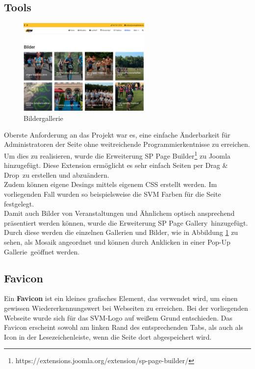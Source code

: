 \documentclass[12pt,a4paper]{article}
\begin{document}
\subsection{Tools}\label{subsec:Tools}
\begin{figure}
  \includegraphics[width=6.5cm]{Bildergallerie.png}
  \caption{Bildergallerie}
  \label{img:Bildergallerie}
\end{figure}
Oberste Anforderung an das Projekt war es, eine einfache Änderbarkeit für Administratoren der Seite ohne weitreichende Programmierkentnisse zu erreichen. Um dies zu realisieren, wurde die Erweiterung \glqq SP Page Builder\grqq \footnote{\label{foot:SPPageBuilder} https://extensions.joomla.org/extension/sp-page-builder/} zu Joomla hinzugefügt. Diese Extension ermöglicht es sehr einfach Seiten per \glqq Drag \& Drop\grqq \ zu erstellen und abzuändern. \\
Zudem können eigene Desings mittels eigenem CSS erstellt werden. Im vorliegenden Fall wurden so beispielsweise die SVM Farben für die Seite festgelegt.\\
Damit auch Bilder von Veranstaltungen und Ähnlichem optisch ansprechend präsentiert werden können, wurde die Erweiterung \glqq SP Page Gallery\grqq \ hinzugefügt. Durch diese werden die einzelnen Gallerien und Bilder, wie in Abbildung \ref{img:Bildergallerie} zu sehen, als Mosaik angeordnet und können durch Anklicken in einer \glqq Pop-Up Gallerie\grqq \ geöffnet werden.


\subsection{Favicon}

Ein \textbf{Favicon} ist ein kleines grafisches Element, das verwendet wird, um einen gewissen Wiedererkennungswert bei Webseiten zu erreichen.
Bei der vorliegenden Webseite wurde sich für das SVM-Logo auf weißem Grund entschieden. Das Favicon erscheint sowohl am linken Rand des entsprechenden Tabs, als auch als Icon in der Lesezeichenleiste, wenn die Seite dort abgespeichert wird.
\end{document}
